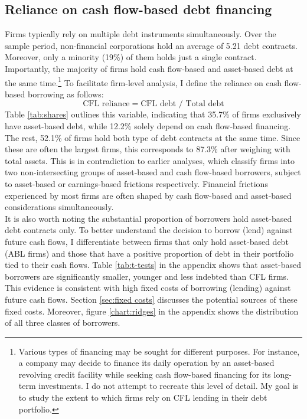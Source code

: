 \documentclass[12pt]{article}
\begin{document}
\subsection{Reliance on cash flow-based debt financing \label{sec:CFL reliance}}
Firms typically rely on multiple debt instruments simultaneously. Over the sample period, non-financial corporations hold an average of 5.21 debt contracts. Moreover, only a minority (19\%) of them holds just a single contract. Importantly, the majority of firms hold cash flow-based and asset-based debt at the same time.\footnote{Various types of financing may be sought for different purposes. For instance, a company may decide to finance its daily operation by an asset-based revolving credit facility while seeking cash flow-based financing for its long-term investments. I do not attempt to recreate this level of detail. My goal is to study the extent to which firms rely on CFL lending in their debt portfolio.}  To facilitate firm-level analysis, I define the reliance on cash flow-based borrowing as follows: 
$$ \text{CFL reliance}  = \text{CFL debt } / \text{ Total debt} $$
Table \ref{tab:shares} outlines this variable, indicating that 35.7\% of firms exclusively have asset-based debt, while 12.2\% solely depend on cash flow-based financing. The rest, 52.1\% of firms hold both type of debt contracts at the same time. Since these are often the largest firms, this corresponds to 87.3\% after weighing with total assets. This is in contradiction to earlier analyses, which classify firms into two non-intersecting groups of asset-based and cash flow-based borrowers, subject to asset-based or earnings-based frictions respectively. Financial frictions experienced by most firms are often shaped by cash flow-based and asset-based considerations simultaneously. \vspace{3mm} \\
\noindent It is also worth noting the substantial proportion of borrowers hold asset-based debt contracts only. To better understand the decision to borrow (lend) against future cash flows, I differentiate between firms that only hold asset-based debt (ABL firms) and those that have a positive proportion of debt in their portfolio tied to their cash flows. Table \ref{tab:t-tests} in the appendix shows that asset-based borrowers are significantly smaller, younger and less indebted than CFL firms. This evidence is consistent with high fixed costs of borrowing (lending) against future cash flows. Section \ref{sec:fixed costs} discusses the potential sources of these fixed costs.  Moreover, figure \ref{chart:ridges} in the appendix shows the distribution of all three classes of borrowers.
\end{document}
